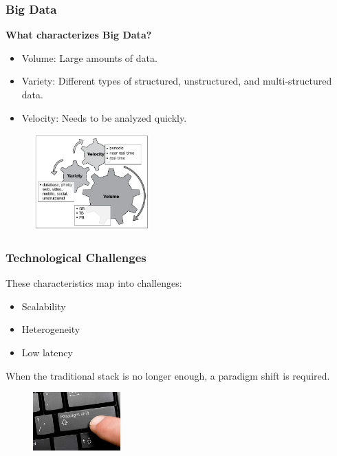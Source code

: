 \documentclass[hyperref={pdfpagelabels=true}]{beamer}
\begin{document}
\begin{frame}
\end{frame}

\begin{frame}
\frametitle{Big Data}
\textbf{What characterizes Big Data?}%
    \begin{itemize}
      \item<2->Volume: Large amounts of data.
      \item<3->Variety: Different types of structured, unstructured, and multi-structured data.
      \item<4->Velocity: Needs to be analyzed quickly.
      \end{itemize}
    \begin{figure}       
	\includegraphics[width=0.4\textwidth]{3vs.png}      
     \end{figure}      
\end{frame}

\begin{frame}
\frametitle{Technological Challenges}
These characteristics map into challenges:
    \begin{itemize}
      \item Scalability %
      \item Heterogeneity %
      \item Low latency %
      \end{itemize}
\vspace{5mm}      
When the traditional stack is no longer enough, a paradigm shift is required.
\begin{figure}   
  \includegraphics[width=0.3\textwidth]{paradigm_shift.jpg}   
\end{figure}   
\end{frame}
\end{document}
